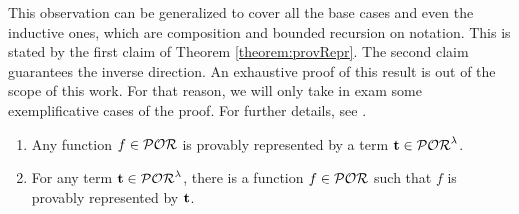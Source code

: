 {\noindent
This observation can be generalized to cover all the base cases
and even the inductive ones,
which are composition and bounded recursion on notation.
This is stated by the first claim of Theorem \ref{theorem:provRepr}.
The second claim guarantees the inverse direction.
An exhaustive proof of this result is out of the scope of this work.
For that reason, we will only take in exam some exemplificative cases of the proof. For further details, see \cite{RBA}.









%






\begin{theorem}\label{theorem:provRepr}
\begin{enumerate}~
\itemsep0em
\item Any function $f\in \mathcal{POR}$ is provably represented
by a term ${\mathbf t} \in \mathcal{POR}^\lambda$.
\item For any term ${\mathbf t} \in \mathcal{POR}^\lambda$,
there is a function $f\in \mathcal{POR}$ such that
$f$ is provably represented by ${\mathbf t}$.
\end{enumerate}
\end{theorem}

}
